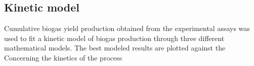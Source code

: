 \subsection{Kinetic model}
Cumulative biogas yield production obtained from the experimental assays was used to fit a kinetic model of biogas production through three different mathematical models. The best modeled results are plotted against the
Concerning the kinetics of the process